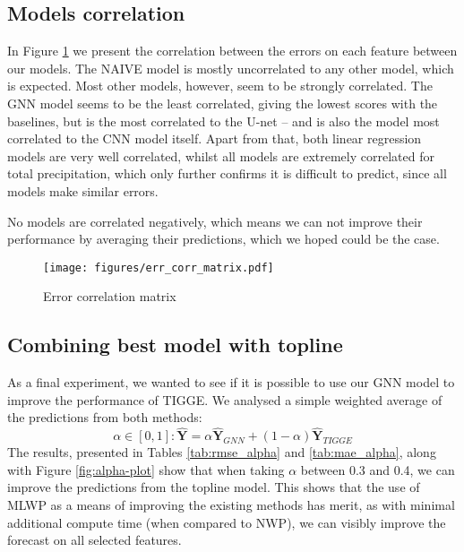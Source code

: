 \subsection{Models correlation}
In Figure \ref{fig:err-cor} we present the correlation between the errors on each feature between our models. The NAIVE model is mostly uncorrelated to any other model, which is expected. Most other models, however, seem to be strongly correlated. The GNN model seems to be the least correlated, giving the lowest scores with the baselines, but is the most correlated to the U-net -- and is also the model most correlated to the CNN model itself. Apart from that, both linear regression models are very well correlated, whilst all models are extremely correlated for total precipitation, which only further confirms it is difficult to predict, since all models make similar errors.

No models are correlated negatively, which means we can not improve their performance by averaging their predictions, which we hoped could be the case.

\begin{figure}[!ht]
    \centering
    \texttt{[image: figures/err\_corr\_matrix.pdf]}
    \caption{Error correlation matrix}
    \label{fig:err-cor}
\end{figure}

\subsection{Combining best model with topline}
As a final experiment, we wanted to see if it is possible to use our GNN model to improve the performance of TIGGE. We analysed a simple weighted average of the predictions from both methods:
\[
    \alpha \in [0,1]: \mathbf{\hat{Y}} = \alpha \mathbf{\hat{Y}}_{GNN} + (1 - \alpha) \mathbf{\hat{Y}}_{TIGGE} 
\]
The results, presented in Tables \ref{tab:rmse_alpha} and \ref{tab:mae_alpha}, along with Figure \ref{fig:alpha-plot} show that when taking $\alpha$ between 0.3 and 0.4, we can improve the predictions from the topline model. This shows that the use of MLWP as a means of improving the existing methods has merit, as with minimal additional compute time (when compared to NWP), we can  visibly improve the forecast on all selected features.

